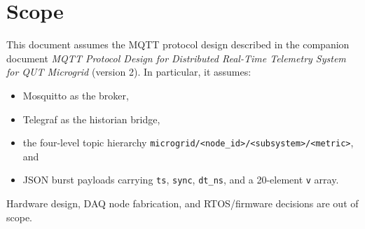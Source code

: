 \section{Scope}
This document assumes the MQTT protocol design described in the companion document \textit{MQTT Protocol Design for Distributed Real-Time Telemetry System for QUT Microgrid} (version 2). In particular, it assumes:
\begin{itemize}[noitemsep]
  \item Mosquitto as the broker,
  \item Telegraf as the historian bridge,
  \item the four-level topic hierarchy \texttt{microgrid/<node\_id>/<subsystem>/<metric>}, and
  \item JSON burst payloads carrying \texttt{ts}, \texttt{sync}, \texttt{dt\_ns}, and a 20-element \texttt{v} array.
\end{itemize}

Hardware design, DAQ node fabrication, and RTOS/firmware decisions are out of scope.
